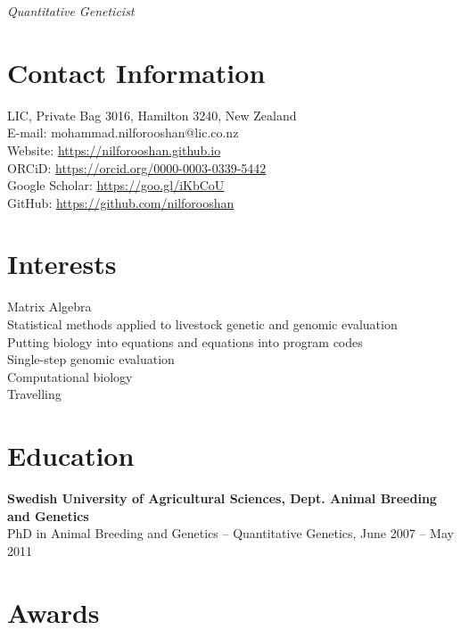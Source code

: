 \documentclass[margin,line]{res}
\begin{document}
 \hfill {\em Quantitative Geneticist}

\begin{resume}
  \section{\sc Contact Information}

  LIC, Private Bag 3016, Hamilton 3240, New Zealand \\
  {E-mail:}  mohammad.nilforooshan@lic.co.nz \\
  {Website:} \url{https://nilforooshan.github.io} \\
  {ORCiD:} \url{https://orcid.org/0000-0003-0339-5442} \\
  {Google Scholar:} \url{https://goo.gl/iKbCoU} \\
  {GitHub:}  \url{https://github.com/nilforooshan}
  \section{\sc Interests}

  Matrix Algebra \\
  Statistical methods applied to livestock genetic and genomic evaluation \\
  Putting biology into equations and equations into program codes \\
  Single-step genomic evaluation \\
  Computational biology \\
  Travelling
  \section{\sc Education}

   {\bf Swedish University of Agricultural Sciences, Dept. Animal Breeding and Genetics} \\
  PhD in Animal Breeding and Genetics -- Quantitative Genetics, June 2007 -- May 2011
  \section{\sc Awards}


\end{resume}
\end{document}
